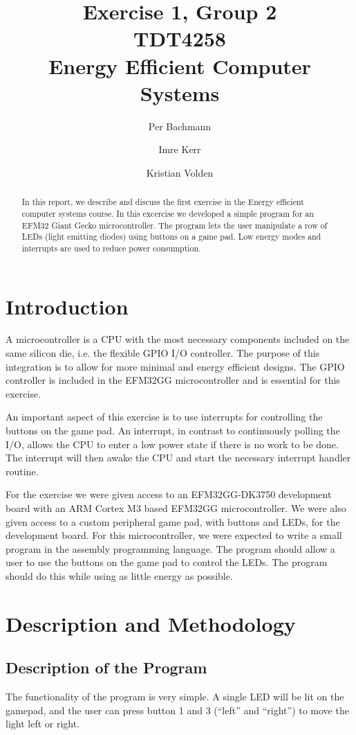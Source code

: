 \documentclass[a4paper, 12pt]{article}
\title{Exercise 1, Group 2 \\ TDT4258 \\ Energy Efficient Computer Systems}
\author{Per Bachmann \and Imre Kerr \and Kristian Volden}
\begin{document}
\maketitle
\begin{abstract}
	In this report, we describe and discuss the first exercise in the Energy efficient computer systems course. In this excercise we developed a simple program for an EFM32 Giant Gecko microcontroller. The program lets the user manipulate a row of LEDs (light emitting diodes) using buttons on a game pad. Low energy modes and interrupts are used to reduce power consumption.
\end{abstract}
\pagebreak
\section{Introduction} %
\label{sec:introduction}
	A microcontroller is a CPU with the most necessary components included on the same silicon die, i.e. the flexible GPIO I/O controller. The purpose of this integration is to allow for more minimal and energy efficient designs. The GPIO controller is included in the EFM32GG microcontroller and is essential for this exercise.
	
	An important aspect of this exercise is to use interrupts for controlling the buttons on the game pad. An interrupt, in contrast to continuously polling the I/O, allows the CPU to enter a low power state if there is no work to be done. The interrupt will then awake the CPU and start the necessary interrupt handler routine.
	
	For the exercise we were given access to an EFM32GG-DK3750 development board with an ARM Cortex M3 based EFM32GG microcontroller. We were also given access to a custom peripheral game pad, with buttons and LEDs, for the development board. For this microcontroller, we were expected to write a small program in the assembly programming language. The program should allow a user to use the buttons on the game pad to control the LEDs. The program should do this while using as little energy as possible.

\section{Description and Methodology} %
\label{sec:description_and_methodology}
    \subsection{Description of the Program} %
    \label{sub:description_of_program}
        The functionality of the program is very simple. A single LED will be lit on the gamepad, and the user can press button 1 and 3 (``left'' and ``right'') to move the light left or right.
\end{document}
